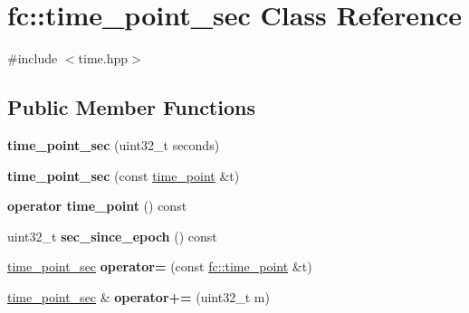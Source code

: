 \hypertarget{classfc_1_1time__point__sec}{}\section{fc\+:\+:time\+\_\+point\+\_\+sec Class Reference}
\label{classfc_1_1time__point__sec}


{\ttfamily \#include $<$time.\+hpp$>$}

\subsection*{Public Member Functions}
\begin{DoxyCompactItemize}
\item 
\mbox{\label{classfc_1_1time__point__sec_aecc6db02e42681cf377dd8f128567b94}} 
{\bfseries time\+\_\+point\+\_\+sec} (uint32\+\_\+t seconds)
\item 
\mbox{\label{classfc_1_1time__point__sec_af142f6b7a58ba2e24d82c6d931ea32bd}} 
{\bfseries time\+\_\+point\+\_\+sec} (const \mbox{\hyperlink{classfc_1_1time__point}{time\+\_\+point}} \&t)
\item 
\mbox{\label{classfc_1_1time__point__sec_a73dd13953a525b22dd371903d337c2c9}} 
{\bfseries operator time\+\_\+point} () const
\item 
\mbox{\label{classfc_1_1time__point__sec_adb7ba1e3676c8074ce8f417e15a57ef7}} 
uint32\+\_\+t {\bfseries sec\+\_\+since\+\_\+epoch} () const
\item 
\mbox{\label{classfc_1_1time__point__sec_adf354265ae353527155c2cd9086f5d50}} 
\mbox{\hyperlink{classfc_1_1time__point__sec}{time\+\_\+point\+\_\+sec}} {\bfseries operator=} (const \mbox{\hyperlink{classfc_1_1time__point}{fc\+::time\+\_\+point}} \&t)
\item 
\mbox{\label{classfc_1_1time__point__sec_a3bfad5ac28831576796cb103a3554abe}} 
\mbox{\hyperlink{classfc_1_1time__point__sec}{time\+\_\+point\+\_\+sec}} \& {\bfseries operator+=} (uint32\+\_\+t m)
\item 
\mbox{\label{classfc_1_1time__point__sec_a2d1a748a9204795fb65ddf505fb81338}} 

\end{DoxyCompactItemize}
